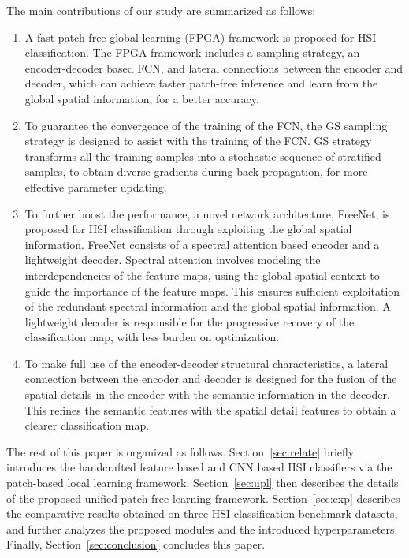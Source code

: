 \documentclass[journal]{IEEEtran}
\begin{document}
The main contributions of our study are summarized as follows:
\begin{enumerate}
  \item A fast patch-free global learning (FPGA) framework is proposed for HSI classification. The FPGA framework includes a sampling strategy, an encoder-decoder based FCN, and lateral connections between the encoder and decoder, which can achieve faster patch-free inference and learn from the global spatial information, for a better accuracy.
  \item To guarantee the convergence of the training of the FCN, the GS sampling strategy is designed to assist with the training of the FCN. GS strategy transforms all the training samples into a stochastic sequence of stratified samples, to obtain diverse gradients during back-propagation, for more effective parameter updating.
  \item To further boost the performance, a novel network architecture, FreeNet, is proposed for HSI classification through exploiting the global spatial information. FreeNet consists of a spectral attention based encoder and a lightweight decoder. Spectral attention involves modeling the interdependencies of the feature maps, using the global spatial context to guide the importance of the feature maps. This ensures sufficient exploitation of the redundant spectral information and the global spatial information. A lightweight decoder is responsible for the progressive recovery of the classification map, with less burden on optimization.
  \item To make full use of the encoder-decoder structural characteristics, a lateral connection between the encoder and decoder is designed for the fusion of the spatial details in the encoder with the semantic information in the decoder. This refines the semantic features with the spatial detail features to obtain a clearer classification map.
\end{enumerate}

The rest of this paper is organized as follows.
Section~\ref{sec:relate} briefly introduces the handcrafted feature based and CNN based HSI classifiers via the patch-based local learning framework.
Section~\ref{sec:upl} then describes the details of the proposed unified patch-free learning framework.
Section~\ref{sec:exp} describes the comparative results obtained on three HSI classification benchmark datasets, and further analyzes the proposed modules and the introduced hyperparameters.
Finally, Section~\ref{sec:conclusion} concludes this paper.
\end{document}
